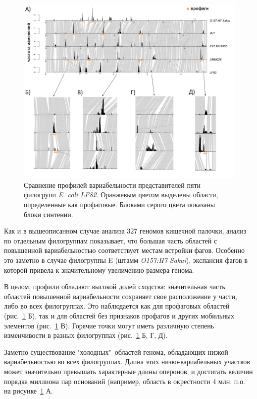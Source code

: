 \begin{figure}[!ht] 
  \center
    \includegraphics[width=\textwidth]{Dissertation/images/complexity/coli_phylogroups_complexity_3.png}
  \caption{Сравнение профилей вариабельности представителей пяти филогрупп \textit{E. coli LF82}. Оранжевым цветом выделены области, определенные как профаговые. Блоками серого цвета показаны блоки синтении.}
  \label{img:phylogroups_complex} 
\end{figure}

Как и в вышеописанном случае анализа 327 геномов кишечной палочки, анализ по отдельным филогруппам показывает, что большая часть областей с повышенной вариабельностью соответствует местам встройки фагов. Особенно это заметно в случае филогруппы E (штамм \textit{O157:H7 Sakai}), экспансия фагов в которой привела к значительному увеличению размера генома.   

В целом, профили обладают высокой долей сходства: значительная часть областей повышенной вариабельности сохраняет свое расположение у части, либо во всех филогруппах. Это наблюдается как для профаговых областей (рис.~\ref{img:phylogroups_complex} Б), так и для областей без признаков профагов и других мобильных элементов (рис.~\ref{img:phylogroups_complex} В). Горячие точки могут иметь различную степень изменчивости в разных филогруппах (рис.~\ref{img:phylogroups_complex} Б, Г, Д).

Заметно существование "холодных"\ областей генома, обладающих низкой вариабельностью во всех филогруппах. Длина этих низко-вариабельных участков может значительно превышать характерные длины оперонов, и достигать величин порядка миллиона пар оснований (например, область в окрестности 4 млн. п.о. на рисунке~\ref{img:phylogroups_complex} А.

